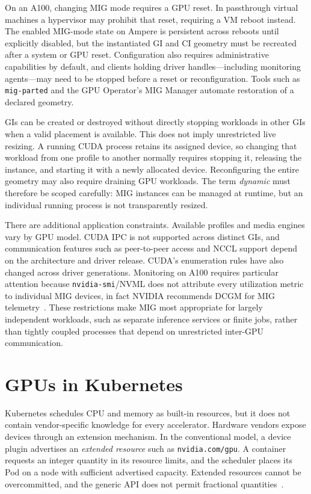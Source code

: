 On an A100, changing MIG mode requires a GPU reset. In passthrough virtual machines a hypervisor may prohibit that reset, requiring a VM reboot instead. The enabled MIG-mode state on Ampere is persistent across reboots until explicitly disabled, but the instantiated GI and CI geometry must be recreated after a system or GPU reset. Configuration also requires administrative capabilities by default, and clients holding driver handles---including monitoring agents---may need to be stopped before a reset or reconfiguration. Tools such as \texttt{mig-parted} and the GPU Operator's MIG Manager automate restoration of a declared geometry.

GIs can be created or destroyed without directly stopping workloads in other GIs when a valid placement is available. This does not imply unrestricted live resizing. A running CUDA process retains its assigned device, so changing that workload from one profile to another normally requires stopping it, releasing the instance, and starting it with a newly allocated device. Reconfiguring the entire geometry may also require draining GPU workloads. The term \emph{dynamic} must therefore be scoped carefully: MIG instances can be managed at runtime, but an individual running process is not transparently resized.

There are additional application constraints. Available profiles and media engines vary by GPU model. CUDA IPC is not supported across distinct GIs, and communication features such as peer-to-peer access and NCCL support depend on the architecture and driver release. CUDA's enumeration rules have also changed across driver generations. Monitoring on A100 requires particular attention because \texttt{nvidia-smi}/NVML does not attribute every utilization metric to individual MIG devices, in fact NVIDIA recommends DCGM for MIG telemetry~\cite{nvidia2026migdeployment,nvidia2026miggettingstarted}. These restrictions make MIG most appropriate for largely independent workloads, such as separate inference services or finite jobs, rather than tightly coupled processes that depend on unrestricted inter-GPU communication.

\section{GPUs in Kubernetes}
\label{sec:gpus-kubernetes}

Kubernetes schedules CPU and memory as built-in resources, but it does not contain vendor-specific knowledge for every accelerator. Hardware vendors expose devices through an extension mechanism. In the conventional model, a device plugin advertises an \emph{extended resource} such as \texttt{nvidia.com/gpu}. A container requests an integer quantity in its resource limits, and the scheduler places its Pod on a node with sufficient advertised capacity. Extended resources cannot be overcommitted, and the generic API does not permit fractional quantities~\cite{kubernetes135deviceplugins,kubernetesgpuscheduling}.

